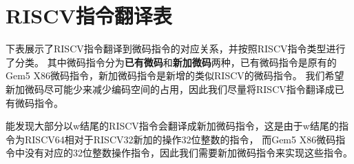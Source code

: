 \chapter{RISCV指令翻译表}

下表展示了RISCV指令翻译到微码指令的对应关系，并按照RISCV指令类型进行了分类。
其中微码指令分为\textbf{已有微码}和\textbf{新加微码}两种，已有微码指令是原有的Gem5 X86微码指令，新加微码指令是新增的类似RISCV的微码指令。
我们希望新加微码尽可能少来减少编码空间的占用，因此我们尽量将RISCV指令翻译成已有微码指令。

能发现大部分以w结尾的RISCV指令会翻译成新加微码指令，这是由于w结尾的指令为RISCV64相对于RISCV32新加的操作32位整数的指令，
而Gem5 X86微码指令中没有对应的32位整数操作指令，因此我们需要新加微码指令来实现这些指令。



